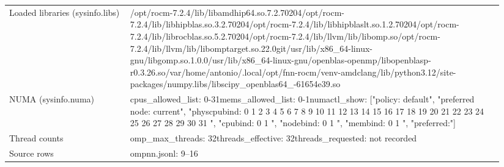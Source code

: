 \begin{longtable}{>{\raggedright\arraybackslash}p{0.23\linewidth}>{\raggedright\arraybackslash}p{0.71\linewidth}}
Loaded libraries (sysinfo.libs) & /\allowbreak{}opt/\allowbreak{}rocm-7.2.4/\allowbreak{}lib/\allowbreak{}libamdhip64.so.7.2.70204\newline /\allowbreak{}opt/\allowbreak{}rocm-7.2.4/\allowbreak{}lib/\allowbreak{}libhipblas.so.3.2.70204\newline /\allowbreak{}opt/\allowbreak{}rocm-7.2.4/\allowbreak{}lib/\allowbreak{}libhipblaslt.so.1.2.70204\newline /\allowbreak{}opt/\allowbreak{}rocm-7.2.4/\allowbreak{}lib/\allowbreak{}librocblas.so.5.2.70204\newline /\allowbreak{}opt/\allowbreak{}rocm-7.2.4/\allowbreak{}lib/\allowbreak{}llvm/\allowbreak{}lib/\allowbreak{}libomp.so\newline /\allowbreak{}opt/\allowbreak{}rocm-7.2.4/\allowbreak{}lib/\allowbreak{}llvm/\allowbreak{}lib/\allowbreak{}libomptarget.so.22.0git\newline /\allowbreak{}usr/\allowbreak{}lib/\allowbreak{}x86\_\allowbreak{}64-linux-gnu/\allowbreak{}libgomp.so.1.0.0\newline /\allowbreak{}usr/\allowbreak{}lib/\allowbreak{}x86\_\allowbreak{}64-linux-gnu/\allowbreak{}openblas-openmp/\allowbreak{}libopenblasp-r0.3.26.so\newline /\allowbreak{}var/\allowbreak{}home/\allowbreak{}antonio/\allowbreak{}.local/\allowbreak{}opt/\allowbreak{}fnn-rocm/\allowbreak{}venv-amdclang/\allowbreak{}lib/\allowbreak{}python3.12/\allowbreak{}site-packages/\allowbreak{}numpy.libs/\allowbreak{}libscipy\_\allowbreak{}openblas64\_\allowbreak{}-61654e39.so \\
NUMA (sysinfo.numa) & cpus\_\allowbreak{}allowed\_\allowbreak{}list: 0-31\newline mems\_\allowbreak{}allowed\_\allowbreak{}list: 0-1\newline numactl\_\allowbreak{}show: ["policy: default", "preferred node: current", "physcpubind: 0 1 2 3 4 5 6 7 8 9 10 11 12 13 14 15 16 17 18 19 20 21 22 23 24 25 26 27 28 29 30 31 ", "cpubind: 0 1 ", "nodebind: 0 1 ", "membind: 0 1 ", "preferred:"] \\
Thread counts & omp\_\allowbreak{}max\_\allowbreak{}threads: 32\newline threads\_\allowbreak{}effective: 32\newline threads\_\allowbreak{}requested: not recorded \\
Source rows & ompnn.jsonl: 9–16 \\
\end{longtable}
